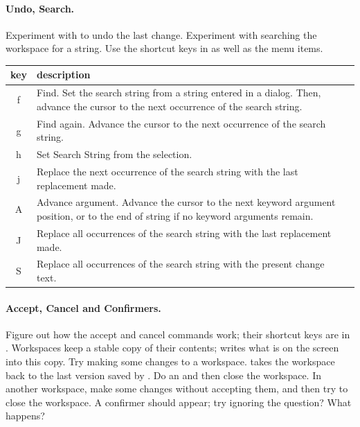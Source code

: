 \documentclass[a4paper,10pt,twoside]{book}
\begin{document}
\paragraph{Undo, Search.} Experiment with  to undo the last change. Experiment with searching the workspace for a string. Use the shortcut keys in  as well as the menu items.

\begin{table}[htbp]
   \centering
   \begin{tabular}{cp{5in}c} 		%
      \toprule
      key    & description &\\
      \midrule
      f      & Find. Set the search string from a string entered in a dialog. Then, advance the cursor to the next occurrence of the search string.
&  \\
  

g & Find again. Advance the cursor to the next occurrence of the search string. & \\

h & Set Search String from the selection. & \\

j & Replace the next occurrence of the search string with the last replacement made. & \\

A & Advance argument. Advance the cursor to the next keyword argument position, or to the end of string if no keyword arguments remain. & \\

J & Replace all occurrences of the search string with the last replacement made. & \\

S & Replace all occurrences of the search string with the present change text. & \\

      \bottomrule
   \end{tabular}
\end{table}

\paragraph{Accept, Cancel and Confirmers.}
Figure out how the accept and cancel commands work; their shortcut keys are in .
Workspaces keep a stable copy of their contents;  writes what is on the screen into this copy.
Try making some changes to a workspace.  takes the workspace back to the last version saved by . Do an  and then close the workspace.
In another workspace, make some changes without accepting them, and then try to close the workspace. A confirmer should appear; try ignoring the question? What happens?
\end{document}
